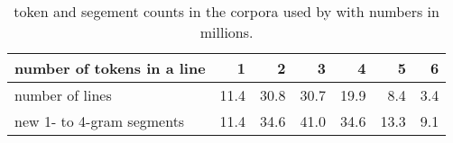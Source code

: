 \begin{table}[t]
 \caption{token and segement counts in the corpora used by \citeauthor{Risvik:2003} with numbers in millions.}
 \label{table-token-segments-risvik-2003}
 \centering
 \small
 \begin{tabular}{@{}lrrrrrr@{}}
  \toprule
 number of tokens in a line & 1 & 2 & 3 & 4 & 5 & 6 \\
  \midrule
  number of lines & 11.4 & 30.8 & 30.7 & 19.9 & 8.4 & 3.4  \\
  new 1- to 4-gram segments & 11.4 & 34.6 & 41.0 & 34.6 & 13.3 & 9.1 \\
  \bottomrule
 \end{tabular}
\end{table}
